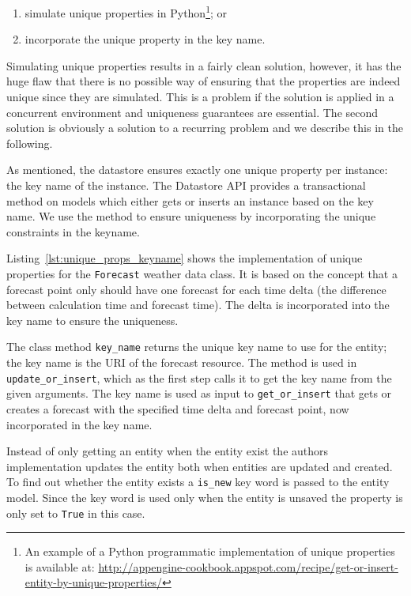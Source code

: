 \begin{enumerate}
  \item simulate unique properties in Python\footnote{An example of a Python
  programmatic implementation of unique properties is available at:
  \url{http://appengine-cookbook.appspot.com/recipe/get-or-insert-entity-by-unique-properties/}};
  or
  \item incorporate the unique property in the key name.
\end{enumerate}

Simulating unique properties results in a fairly clean solution, however, it has
the huge flaw that there is no possible way of ensuring that the properties are
indeed unique since they are simulated. This is a problem if the solution is
applied in a concurrent environment and uniqueness guarantees are essential. The
second solution is obviously a solution to a recurring problem and we describe
this in the following.

As mentioned, the datastore ensures exactly one unique property per instance: the
key name of the instance. The Datastore API provides a transactional method on
models which either gets or inserts an instance based on the key name. We use the
method to ensure uniqueness by incorporating the unique constraints in the
keyname.

Listing~\ref{lst:unique_props_keyname} shows the implementation of unique
properties for the \verb|Forecast| weather data class. It is based on the concept
that a forecast point only should have one forecast for each time delta (the
difference between calculation time and forecast time). The delta is incorporated
into the key name to ensure the uniqueness.

The class method \verb|key_name| returns the unique key name to use for the
entity; the key name is the URI of the forecast resource. The method is used in
\verb|update_or_insert|, which as the first step calls it to get the key name
from the given arguments. The key name is used as input to \verb|get_or_insert|
that gets or creates a forecast with the specified time delta and forecast point,
now incorporated in the key name.

Instead of only getting an entity when the entity exist the authors
implementation updates the entity both when entities are updated and created. To
find out whether the entity exists a \verb|is_new| key word is passed to the
entity model. Since the key word is used only when the entity is unsaved the
property is only set to \verb|True| in this case.


